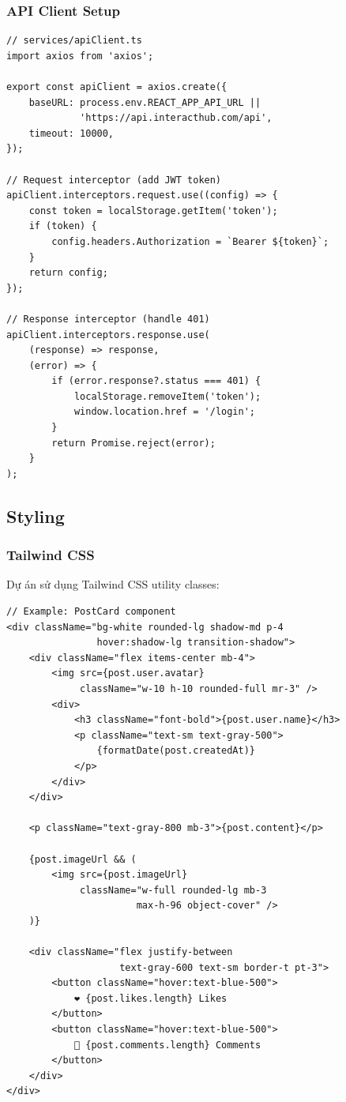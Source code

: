 \subsubsection{API Client Setup}
\begin{verbatim}
// services/apiClient.ts
import axios from 'axios';

export const apiClient = axios.create({
    baseURL: process.env.REACT_APP_API_URL || 
             'https://api.interacthub.com/api',
    timeout: 10000,
});

// Request interceptor (add JWT token)
apiClient.interceptors.request.use((config) => {
    const token = localStorage.getItem('token');
    if (token) {
        config.headers.Authorization = `Bearer ${token}`;
    }
    return config;
});

// Response interceptor (handle 401)
apiClient.interceptors.response.use(
    (response) => response,
    (error) => {
        if (error.response?.status === 401) {
            localStorage.removeItem('token');
            window.location.href = '/login';
        }
        return Promise.reject(error);
    }
);
\end{verbatim}

\subsection{Styling}

\subsubsection{Tailwind CSS}
Dự án sử dụng Tailwind CSS utility classes:

\begin{verbatim}
// Example: PostCard component
<div className="bg-white rounded-lg shadow-md p-4 
                hover:shadow-lg transition-shadow">
    <div className="flex items-center mb-4">
        <img src={post.user.avatar} 
             className="w-10 h-10 rounded-full mr-3" />
        <div>
            <h3 className="font-bold">{post.user.name}</h3>
            <p className="text-sm text-gray-500">
                {formatDate(post.createdAt)}
            </p>
        </div>
    </div>
    
    <p className="text-gray-800 mb-3">{post.content}</p>
    
    {post.imageUrl && (
        <img src={post.imageUrl} 
             className="w-full rounded-lg mb-3 
                       max-h-96 object-cover" />
    )}
    
    <div className="flex justify-between 
                    text-gray-600 text-sm border-t pt-3">
        <button className="hover:text-blue-500">
            ❤️ {post.likes.length} Likes
        </button>
        <button className="hover:text-blue-500">
            💬 {post.comments.length} Comments
        </button>
    </div>
</div>
\end{verbatim}

